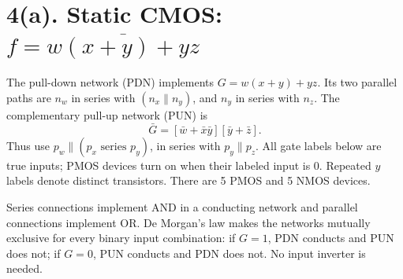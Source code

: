 \documentclass[11pt]{article}
\newcommand{\mos}[4]{\begin{scope}[shift={(#1,#2)}]
\draw (0,.24)--(0,-.24);
\draw (0,.20)--(.25,.20)--(.25,.5);
\draw (0,-.20)--(.25,-.20)--(.25,-.5);
\draw (-.16,.23)--(-.16,-.23);
\ifnum#4=1\draw (-.26,0) circle (.06);\draw (-.75,0)--(-.32,0);\else\draw (-.75,0)--(-.16,0);\fi
\node[anchor=east,font=\small] at (-.76,0) {$#3$};
\end{scope}}
\newcommand{\ground}[2]{\draw (#1,#2)--(#1,{#2-.12});\draw ({#1-.17},{#2-.12})--({#1+.17},{#2-.12});\draw ({#1-.11},{#2-.20})--({#1+.11},{#2-.20});}
\newcommand{\rail}[3]{\draw (#1,#2)--(#1,{#2+.15});\node[above,font=\small] at (#1,{#2+.15}) {$#3$};}
\newcommand{\outputnode}[3]{\fill (#1,#2) circle (.04);\draw (#1,#2)--({#1+.7},#2) node[right] {$#3$};}
\begin{document}
\newpage

\section*{4(a). Static CMOS: $f=\overline{w(x+y)+yz}$}
The pull-down network (PDN) implements $G=w(x+y)+yz$. Its two parallel paths are $n_w$ in series with $(n_x\parallel n_y)$, and $n_y$ in series with $n_z$. The complementary pull-up network (PUN) is
\[
 \bar{G}=[\bar{w}+\bar{x}\bar{y}][\bar{y}+\bar{z}].
\]
Thus use $p_w\parallel(p_x\text{ series }p_y)$, in series with $p_y\parallel p_z$. All gate labels below are true inputs; PMOS devices turn on when their labeled input is 0. Repeated $y$ labels denote distinct transistors. There are 5 PMOS and 5 NMOS devices.
\begin{center}\end{center}
Series connections implement AND in a conducting network and parallel connections implement OR. De Morgan's law makes the networks mutually exclusive for every binary input combination: if $G=1$, PDN conducts and PUN does not; if $G=0$, PUN conducts and PDN does not. No input inverter is needed.

\newpage
\end{document}
